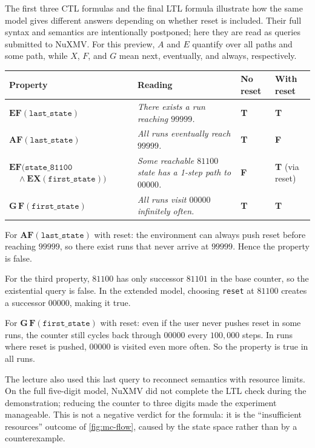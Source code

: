 The first three CTL formulas and the final LTL formula illustrate how the same
model gives different answers depending on whether reset is included.  Their
full syntax and semantics are intentionally postponed; here they are read as
queries submitted to NuXMV.  For this preview, \(A\) and \(E\) quantify over
all paths and some path, while \(X\), \(F\), and \(G\) mean next, eventually,
and always, respectively.

\begin{center}
  \footnotesize
  \renewcommand{\arraystretch}{1.4}
  \begin{tabular}{@{}p{4cm}p{4.4cm}p{1.5cm}p{1.8cm}@{}}
    \toprule
    Property & Reading & No reset & With reset \\
    \midrule
    $\mathbf{EF}(\texttt{last\_state})$
      & \emph{There exists a run reaching $99999$.}
      & \textbf{T} & \textbf{T} \\
    $\mathbf{AF}(\texttt{last\_state})$
      & \emph{All runs eventually reach $99999$.}
      & \textbf{T} & \textbf{F} \\
    $\mathbf{EF}(\texttt{state\_81100}$\newline
    $\quad\wedge \mathbf{EX}(\texttt{first\_state}))$
      & \emph{Some reachable $81100$ state has a 1-step path to $00000$.}
      & \textbf{F} & \textbf{T} (via reset) \\
    $\mathbf{G}\,\mathbf{F}(\texttt{first\_state})$
      & \emph{All runs visit $00000$ infinitely often.}
      & \textbf{T} & \textbf{T} \\
    \bottomrule
  \end{tabular}
\end{center}

For $\mathbf{AF}(\texttt{last\_state})$ with reset: the environment can
always push reset before reaching $99999$, so there exist runs that never
arrive at $99999$.  Hence the property is false.

For the third property, $81100$ has only successor $81101$ in the base
counter, so the existential query is false.  In the extended model, choosing
\texttt{reset} at $81100$ creates a successor $00000$, making it true.

For $\mathbf{G}\,\mathbf{F}(\texttt{first\_state})$ with reset: even if
the user never pushes reset in some runs, the counter still cycles back
through $00000$ every $100{,}000$ steps.  In runs where reset is pushed,
$00000$ is visited even more often.  So the property is true in all runs.

The lecture also used this last query to reconnect semantics with resource
limits.  On the full five-digit model, NuXMV did not complete the LTL check
during the demonstration; reducing the counter to three digits made the
experiment manageable.  This is not a negative verdict for the formula: it is
the ``insufficient resources'' outcome of \cref{fig:mc-flow}, caused by the
state space rather than by a counterexample.

